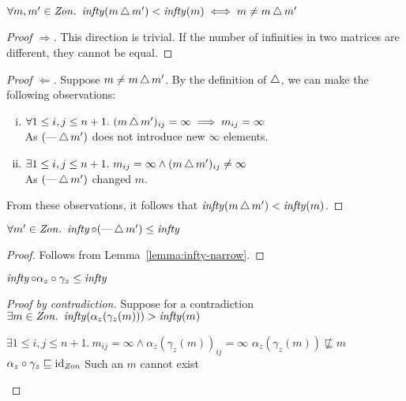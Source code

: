 \begin{lemma}\label{lemma:infty-narrow}
  $\forall m,m^\prime\in\mathit{Zon}.~\operatorname{\mathit{infty}}(m\operatorname{\triangle} m^\prime)<\operatorname{\mathit{infty}}(m)\iff m\neq m\operatorname{\triangle} m^\prime$
  \begin{proof}[Proof $\Rightarrow$]
    This direction is trivial. If the number of infinities in two matrices are different, they cannot be equal.\qedhere
  \end{proof}

  \begin{proof}[Proof $\Leftarrow$]
    Suppose $m\neq m\operatorname{\triangle} m^\prime$. By the definition of $\operatorname{\triangle}$, we can make the following observations:
    \begin{enumerate}[(i)]
      \item $\forall1\leq i,j\leq n+1.~(m\operatorname{\triangle} m^\prime)_{ij}=\infty\implies m_{ij} = \infty$\\
        As $(\text{---}\operatorname{\triangle} m^\prime)$ does not introduce new $\infty$ elements.
      \item $\exists1\leq i,j\leq n+1.~m_{ij}=\infty\wedge(m\operatorname{\triangle} m^\prime)_{ij}\neq\infty$\\
        As $(\text{---}\operatorname{\triangle} m^\prime)$ changed $m$.
    \end{enumerate}
    From these observations, it follows that $\operatorname{\mathit{infty}}(m\operatorname{\triangle} m^\prime)<\operatorname{\mathit{infty}}(m)$.\qedhere
  \end{proof}
\end{lemma}

\begin{corollary}\label{cor:infty-narrow}
  $\forall m^\prime\in\mathit{Zon}.~\operatorname{\mathit{infty}}\circ(\text{---}\operatorname{\triangle} m^\prime)\leq\operatorname{\mathit{infty}}$
  \begin{proof}
    Follows from Lemma~\ref{lemma:infty-narrow}\qedhere.
  \end{proof}
\end{corollary}

\begin{lemma}\label{lemma:infty-closure}
  $\operatorname{\mathit{infty}}\circ\alpha_z\circ\gamma_z\leq\operatorname{\mathit{infty}}$
  \begin{proof}[Proof by contradiction]
    Suppose for a contradiction ${\exists m\in\mathit{Zon}.~\operatorname{\mathit{infty}}(\alpha_z(\gamma_z(m))) > \operatorname{\mathit{infty}}(m)}$
    \begin{itemize}
      \step[\imps] $\exists1\leq i, j\leq n+1.~m_{ij}=\infty\wedge\alpha_z(\gamma_z(m))_{ij} = \infty$
      \step[\imps] $\alpha_z(\gamma_z(m))\not\sqsubseteq m$
      \step[\contras] $\alpha_z\circ\gamma_z\sqsubseteq\operatorname{id}_{\mathit{Zon}}$
      \step[\imps] Such an $m$ cannot exist\qedhere
    \end{itemize}
  \end{proof}
\end{lemma}

